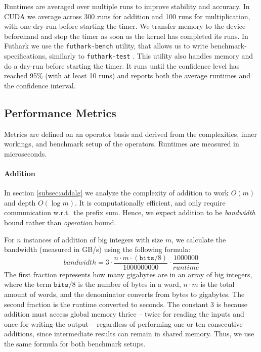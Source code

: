 Runtimes are averaged over multiple runs to improve stability and accuracy. In
CUDA we average across 300 runs for addition and 100 runs for multiplication,
with one dry-run before starting the timer. We transfer memory to the device
beforehand and stop the timer as soon as the kernel has completed its runs. In
Futhark we use the \texttt{futhark-bench} utility, that allows us to write
benchmark-specifications, similarly to \texttt{futhark-test}
\cite{futguide}. This utility also handles memory and do a dry-run before
starting the timer. It runs until the confidence level has reached 95\% (with at
least 10 runs) and reports both the average runtimes and the confidence
interval.

\subsection{Performance Metrics}
\label{subsec:perfmet}

Metrics are defined on an operator basis and derived from the complexities,
inner workings, and benchmark setup of the operators. Runtimes are measured in
microseconds.

\paragraph{Addition}
In section \ref{subsec:addalg} we analyze the complexity of addition to work
$O(m)$ and depth $O(\log m)$. It is computationally efficient, and only require
communication w.r.t.\ the prefix sum. Hence, we expect addition to be
\textit{bandwidth} bound rather than \textit{operation} bound.

For $n$ instances of addition of big integers with size $m$, we calculate the
bandwidth (measured in GB/s) using the following formula:
\begin{equation}
    \label{eq:bandwidth}
    \mathit{bandwidth} = 3 \cdot \dfrac{n \cdot m \cdot (\mathtt{bits}/8)}{1000000000} \cdot \dfrac{1000000}{\mathit{runtime}}
\end{equation}
The first fraction represents how many gigabytes are in an array of big
integers, where the term $\mathtt{bits} / 8$ is the number of bytes in a word,
$n\cdot m$ is the total amount of words, and the denominator converts from bytes to
gigabytes. The second fraction is the runtime converted to seconds. The constant
3 is because addition must access global memory thrice -- twice for reading the
inputs and once for writing the output -- regardless of performing one or ten
consecutive additions, since intermediate results can remain in shared
memory. Thus, we use the same formula for both benchmark setups.


